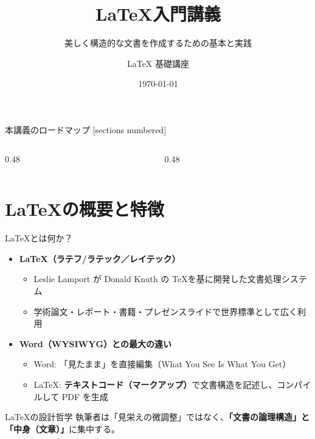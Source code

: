 \documentclass[aspectratio=169,11pt]{beamer}
\title{\LaTeX 入門講義}
\subtitle{美しく構造的な文書を作成するための基本と実践}
\author{LaTeX 基礎講座}
\date{\today}
\institute{LaTeX Beginner Workshop}
\DeclareRobustCommand{\LaTeX}{LaTeX}
\DeclareRobustCommand{\TeX}{TeX}
\begin{document}
\maketitle

\begin{frame}{本講義のロードマップ}
  [sections numbered]
  \begin{columns}[T]
    \begin{column}{0.48\textwidth}
      \tableofcontents[sections={1-4},hideallsubsections]
    \end{column}
    \begin{column}{0.48\textwidth}
      \tableofcontents[sections={5-7},hideallsubsections]
    \end{column}
  \end{columns}
\end{frame}

\section{\LaTeX の概要と特徴}

\begin{frame}{\LaTeX とは何か？}
  \begin{itemize}
    \item \alert{\textbf{\LaTeX（ラテフ/ラテック／レイテック）}}
      \begin{itemize}
        \item Leslie Lamport が Donald Knuth の \TeX を基に開発した文書処理システム
        \item 学術論文・レポート・書籍・プレゼンスライドで世界標準として広く利用
      \end{itemize}
    \vspace{0.5em}
    \item \textbf{Word（WYSIWYG）との最大の違い}
      \begin{itemize}
        \item Word: 「見たまま」を直接編集（What You See Is What You Get）
        \item \LaTeX: \textbf{テキストコード（マークアップ）}で文書構造を記述し、コンパイルして PDF を生成
      \end{itemize}
  \end{itemize}

  \begin{block}{\LaTeX の設計哲学}
    執筆者は「見栄えの微調整」ではなく、\textbf{「文書の論理構造」と「中身（文章）」}に集中する。
  \end{block}
\end{frame}
\end{document}
